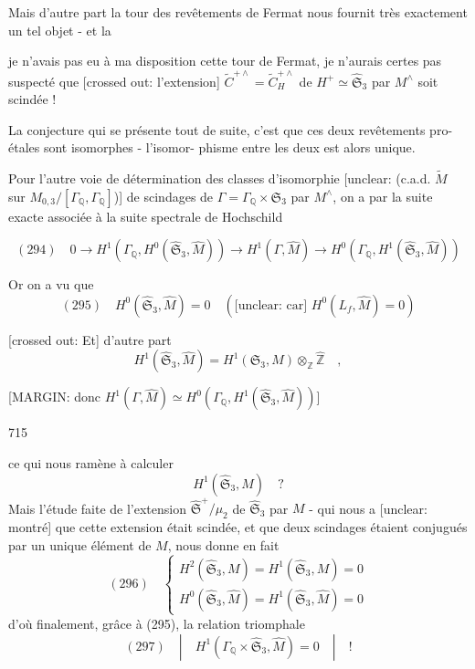 Mais d'autre part la tour des
revêtements de Fermat nous fournit
très exactement un tel objet - et la

\newpage


je n'avais pas eu à ma disposition
cette tour de Fermat, je n'aurais
certes pas suspecté que [crossed out: l'extension] $\widetilde{C}^{+\wedge} = \widetilde{C}^{+\wedge}_{H}$ de
$H^+ \simeq \widehat{\mathfrak{S}}_3$ par $M^\wedge$ soit scindée !

La conjecture qui se présente tout de
suite, c'est que ces deux revêtements
pro-étales sont isomorphes - l'isomor-
phisme entre les deux est alors
unique.

Pour l'autre voie de détermination
des classes d'isomorphie [unclear: (c.a.d. $\tilde{M}$ sur $M_{0,3} / [\Gamma_{\mathbb{Q}}, \Gamma_{\mathbb{Q}}]$)]
de scindages de $\Gamma = \Gamma_{\mathbb{Q}} \times \mathfrak{S}_3$ par
$M^\wedge$, on a par la suite exacte associée
à la suite spectrale de Hochschild

$$ (294) \quad 0 \to H^1(\Gamma_{\mathbb{Q}}, H^0(\widehat{\mathfrak{S}}_3, \widehat{M})) \to H^1(\Gamma, \widehat{M}) \to H^0(\Gamma_{\mathbb{Q}}, H^1(\widehat{\mathfrak{S}}_3, \widehat{M})) $$

Or on a vu que
$$ (295) \quad H^0(\widehat{\mathfrak{S}}_3, \widehat{M}) = 0 \quad (\text{[unclear: car] } H^0(L_f, \widehat{M}) = 0) $$

[crossed out: Et] d'autre part
$$ H^1(\widehat{\mathfrak{S}}_3, \widehat{M}) = H^1(\mathfrak{S}_3, M) \otimes_{\mathbb{Z}} \hat{\mathbb{Z}} \quad , $$

[MARGIN: donc $H^1(\Gamma, \widehat{M}) \simeq H^0(\Gamma_{\mathbb{Q}}, H^1(\widehat{\mathfrak{S}}_3, \widehat{M}))$]

\newpage


715

ce qui nous ramène à calculer
$$H^1(\hat{\mathfrak{S}}_3, M) \quad ?$$
Mais l'étude faite de l'extension $\hat{\mathfrak{S}}^+ / \mu_2$ de
$\hat{\mathfrak{S}}_3$ par $M$ - qui nous a [unclear: montré] que cette
extension était scindée, et que deux
scindages étaient conjugués par un
unique élément de $M$, nous donne
en fait
$$(296) \quad \begin{cases} H^2(\hat{\mathfrak{S}}_3, M) = H^1(\hat{\mathfrak{S}}_3, M) = 0 \\ H^0(\hat{\mathfrak{S}}_3, \hat{M}) = H^1(\hat{\mathfrak{S}}_3, \hat{M}) = 0 \end{cases}$$
d'où finalement, grâce à (295), la
relation triomphale
$$(297) \quad | \quad H^1(\Gamma_{\mathbb{Q}} \times \hat{\mathfrak{S}}_3, \hat{M}) = 0 \quad | \quad !$$


